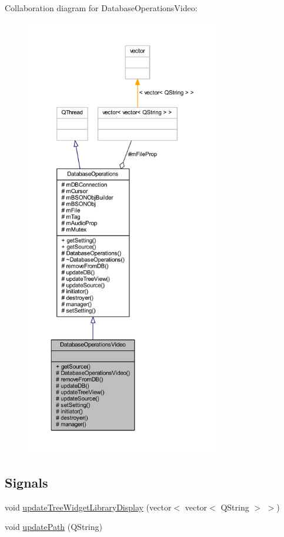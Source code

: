 Collaboration diagram for Database\-Operations\-Video\-:
\nopagebreak
\begin{figure}[H]
\begin{center}
\leavevmode
\includegraphics[height=550pt]{class_database_operations_video__coll__graph}
\end{center}
\end{figure}
\subsection*{Signals}
\begin{DoxyCompactItemize}
\item 
void \hyperlink{class_database_operations_video_a0dd4f0a7c0fb2db04227435dac72651d}{update\-Tree\-Widget\-Library\-Display} (vector$<$ vector$<$ Q\-String $>$ $>$)
\item 
void \hyperlink{class_database_operations_video_a5164513533daa6f588862c032d2412f8}{update\-Path} (Q\-String)
\end{DoxyCompactItemize}
